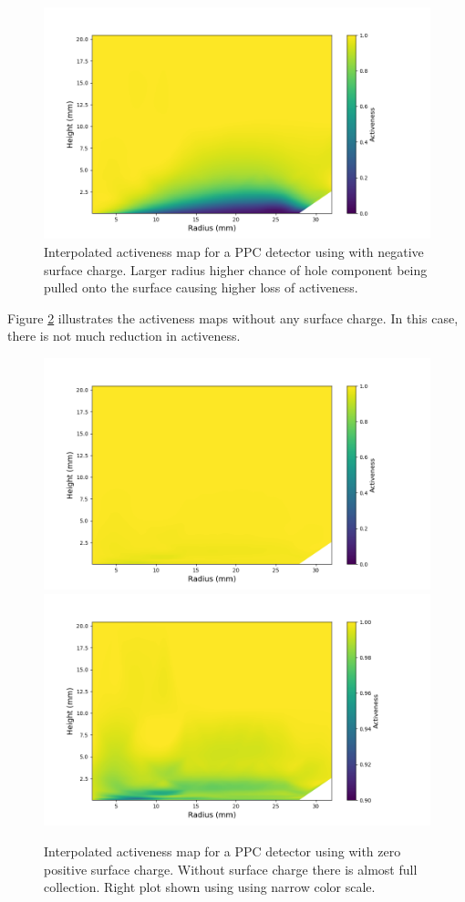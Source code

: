 \begin{figure}%
\centering
\includegraphics[trim={1.4cm 0.5cm 3.2cm 1.755cm},clip,width=0.95\linewidth]{ch5/figs/activeness_map_cubic_sc=-0.3_ponama_1_5000.png}

\caption{Interpolated activeness map for a PPC detector using \ehd with negative surface charge. Larger radius higher chance of hole component being pulled onto the surface causing higher loss of activeness.}
\label{ch5_fig_activeness_map_neg}
\end{figure}

Figure \ref{ch5_fig_interpolated_activeness_map_0} illustrates the activeness maps without any surface charge. In this case, there is not much reduction in activeness. 

\begin{figure}%
\centering
\includegraphics[trim={1.5cm 0cm 3.3cm 1cm},clip,width=0.49\linewidth]{ch5/figs/activeness_map_cubic_sc=0.0_ponama_1_5000_linear_full.png}
\includegraphics[trim={1.5cm 0cm 3.3cm 1cm},clip,width=0.49\linewidth]{ch5/figs/activeness_map_cubic_sc=0.0_ponama_1_5000_linear.png}
\caption{Interpolated activeness map for a PPC detector using \ehd with zero positive surface charge. Without surface charge there is almost full collection. Right plot shown using using narrow color scale.}
\label{ch5_fig_interpolated_activeness_map_0}
\end{figure}

